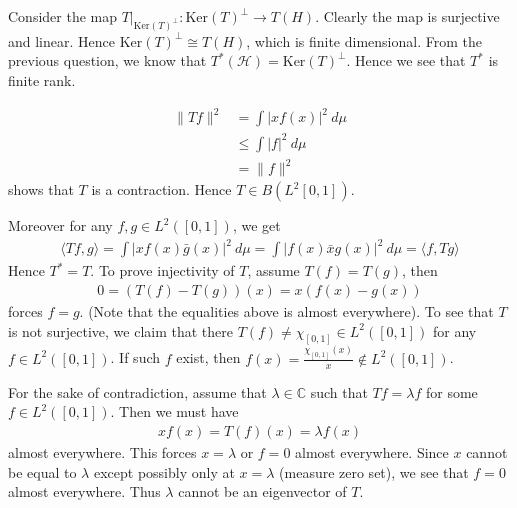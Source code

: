 \documentclass[12pt]{exam}
\theoremstyle{plain} %
\theoremstyle{definition} %
\theoremstyle{remark} %
\begin{document}
\begin{questions}
  \question
  \begin{solution}
    Consider the map $T|_{\textrm{Ker}(T)^\perp}:
    \textrm{Ker}(T)^\perp \to T(H)$. Clearly the map is surjective and
    linear. Hence $ \textrm{Ker}(T)^\perp \cong T(H)$, which is
    finite dimensional. From the previous question, we know that
    $T^*(\mathcal{H}) = \textrm{Ker}(T)^\perp$. Hence we see that
    $T^*$ is finite rank.
  \end{solution}

  \question
  \begin{solution}
    \begin{align*}
      \|Tf\|^2 &= \int |xf(x)|^2 \ d \mu \\
      &\le \int |f|^2 \ d \mu \\
      &= \|f\|^2
    \end{align*}
    shows that $T$ is a contraction. Hence $T \in B(L^2[0, 1])$.
  \end{solution}
  Moreover for any $f, g \in L^2([0, 1])$, we get
  \begin{align*}
    \langle Tf , g \rangle  = \int |xf(x)\bar{g}(x)|^2 \ d \mu =
    \int |f(x)  \bar{x}g(x)|^2 \ d \mu = \langle f , Tg \rangle
  \end{align*}
  Hence $T^* =T$. To prove injectivity of $T$, assume $T(f) = T(g)$, then
  \begin{align*}
    0 = (T(f) - T(g))(x) = x(f(x) - g(x))
  \end{align*}
  forces $f = g$. (Note that the equalities above is almost
  everywhere). To see that $T$ is not surjective, we claim that there
  $T(f) \neq \chi_{[0, 1]} \in L^2([0, 1])$ for any $f \in L^2([0,
  1])$. If such $f$ exist, then $f(x) = \frac{\chi_{[0, 1]}(x)}{x}
  \not \in L^2([0, 1])$.

  For the sake of contradiction, assume that $\lambda \in \mathbb{C}$
  such that $Tf = \lambda f$ for some $f \in L^2([0, 1])$. Then
  we must have
  \begin{align*}
    x f(x) = T(f)(x) = \lambda f(x)
  \end{align*}
  almost everywhere. This forces $x = \lambda$ or $f = 0$ almost
  everywhere. Since $x$ cannot be equal to $\lambda$ except possibly
  only at $x = \lambda$ (measure zero set), we see that $f = 0$
  almost everywhere. Thus $\lambda$ cannot be an eigenvector of $T$.

  \question
  \begin{solution}
    \begin{parts}

\end{parts}
\end{solution}
\end{questions}
\end{document}
